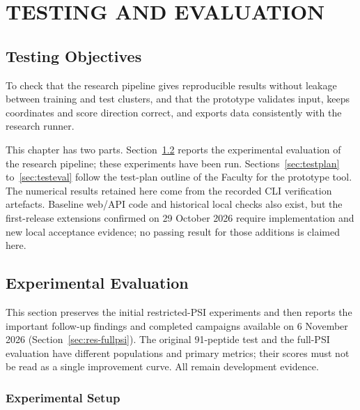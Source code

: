 \chapter{TESTING AND EVALUATION}\label{chap:evaluation}

\section{Testing Objectives}
To check that the research pipeline gives reproducible results without leakage between training and test
clusters, and that the prototype validates input, keeps coordinates and score direction correct, and
exports data consistently with the research runner.

This chapter has two parts. Section~\ref{sec:experiments} reports the experimental evaluation of the
research pipeline; these experiments have been run. Sections~\ref{sec:testplan} to~\ref{sec:testeval} follow
the test-plan outline of the Faculty for the prototype tool. The numerical results retained here come
from the recorded CLI verification artefacts. Baseline web/API code and historical local checks also
exist, but the first-release extensions confirmed on 29 October 2026 require implementation and new
local acceptance evidence; no passing result for those additions is claimed here.

\section{Experimental Evaluation}\label{sec:experiments}
This section preserves the initial restricted-PSI experiments and then reports the important
follow-up findings and completed campaigns available on 6 November 2026
(Section~\ref{sec:res-fullpsi}). The original
91-peptide test and the full-PSI evaluation have different populations and primary metrics;
their scores must not be read as a single improvement curve. All remain development evidence.

\subsection{Experimental Setup}

